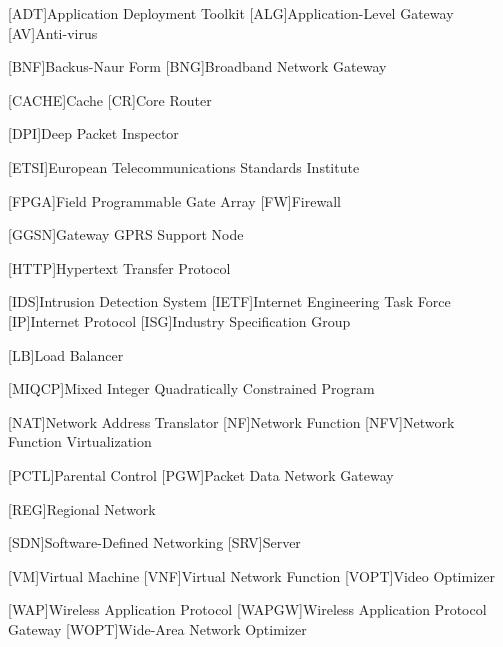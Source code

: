 \documentclass[10pt,a4paper,conference]{IEEEtran}
\begin{document}
\begin{acronym}[WWWW]

[ADT]{Application Deployment Toolkit}
[ALG]{Application-Level Gateway}
[AV]{Anti-virus}

[BNF]{Backus-Naur Form}
[BNG]{Broadband Network Gateway}


[CACHE]{Cache}
[CR]{Core Router}

[DPI]{Deep Packet Inspector}


[ETSI]{European Telecommunications Standards Institute}

[FPGA]{Field Programmable Gate Array}
[FW]{Firewall}


[GGSN]{Gateway GPRS Support Node}

[HTTP]{Hypertext Transfer Protocol }

[IDS]{Intrusion Detection System}
[IETF]{Internet Engineering Task Force}
[IP]{Internet Protocol}
[ISG]{Industry Specification Group}





[LB]{Load Balancer}



[MIQCP]{Mixed Integer Quadratically Constrained Program}

[NAT]{Network Address Translator}
[NF]{Network Function}
[NFV]{Network Function Virtualization}




[PCTL]{Parental Control}
[PGW]{Packet Data Network Gateway}



[REG]{Regional Network}

[SDN]{Software-Defined Networking}
[SRV]{Server}





[VM]{Virtual Machine}
[VNF]{Virtual Network Function}
[VOPT]{Video Optimizer}


[WAP]{Wireless Application Protocol}
[WAPGW]{Wireless Application Protocol Gateway}
[WOPT]{Wide-Area Network Optimizer}







\end{acronym}


































\end{document}
